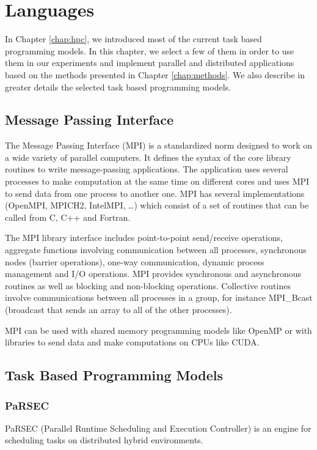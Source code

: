 \chapter{Languages}
\label{chap:languages}
\graphicspath{{chapters/languages/}}



In Chapter \ref{chap:hpc}, we introduced most of the current task based programming models.
In this chapter, we select a few of them in order to use them in our experiments and implement parallel and distributed applications based on the methods presented in Chapter \ref{chap:methods}.
We also describe in greater details the selected task based programming models.

\section{Message Passing Interface}
The Message Passing Interface (MPI) \cite{MPIForum} is a standardized norm designed to work on a wide variety of parallel computers.
It defines the syntax of the core library routines to write message-passing applications.
The application uses several processes to make computation at the same time on different cores and uses MPI to send data from one process to another one.
MPI has several implementations (OpenMPI, MPICH2, IntelMPI, \dots) which consist of a set of routines that can be called from C, C++ and Fortran.

The MPI library interface includes point-to-point send/receive operations, aggregate functions involving communication between all processes, synchronous nodes (barrier operations), one-way communication, dynamic process management and I/O operations.
MPI provides synchronous and asynchronous routines as well as blocking and non-blocking operations.
Collective routines involve communications between all processes in a group, for instance MPI\_Bcast (broadcast that sends an array to all of the other processes).

MPI can be used with shared memory programming models like OpenMP or with libraries to send data and make computations on CPUs like CUDA.


\section{Task Based Programming Models}
\subsection{PaRSEC}
PaRSEC \cite{BBDHL2011} \cite{BBDFH2013} (Parallel Runtime Scheduling and Execution Controller) is an engine for scheduling tasks on distributed hybrid environments.

